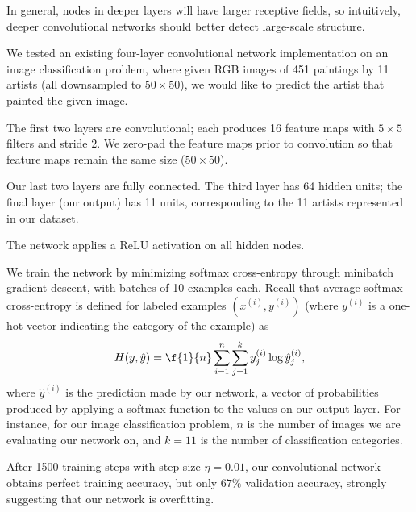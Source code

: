 \documentclass{article}
\newcommand{\sind}[1]{^{(#1)}}
\begin{document}
\begin{multicols}{2}
In general,
nodes in deeper layers will have larger receptive fields,
so intuitively,
deeper convolutional networks should better detect large-scale structure.

We tested an existing four-layer convolutional network implementation
on an image classification problem,
where given RGB images of 451 paintings by 11 artists
(all downsampled to $50\times 50$),
we would like to predict the artist that painted the given image.

The first two layers are convolutional;
each produces 16 feature maps
with $5\times 5$ filters and stride $2$.
We zero-pad the feature maps prior to convolution
so that feature maps remain the same size ($50\times 50$).

Our last two layers are fully connected.
The third layer has 64 hidden units;
the final layer (our output) has 11 units,
corresponding to the 11 artists represented in our dataset.

The network applies a ReLU activation on all hidden nodes.

We train the network by minimizing softmax cross-entropy
through minibatch gradient descent,
with batches of 10 examples each.
Recall that average softmax cross-entropy is defined
for labeled examples $(x\sind{i}, y\sind{i})$
(where $y\sind{i}$ is a one-hot vector indicating the category of the example)
as
\begin{equation}
    H(y, \hat y) = \f{1}{n}\sum_{i=1}^n
                             \sum_{j=1}^k
                               y\sind{i}_j \log \hat y\sind{i}_j,
\end{equation}
where $\hat y\sind{i}$ is the prediction made by our network,
a vector of probabilities
produced by applying a softmax function
to the values on our output layer.
For instance, for our image classification problem,
$n$ is the number of images we are evaluating our network on,
and $k=11$ is the number of classification categories.

After 1500 training steps with step size $\eta = 0.01$,
our convolutional network obtains perfect training accuracy,
but only $67\%$ validation accuracy,
strongly suggesting that our network is overfitting.


\end{multicols}
\end{document}
